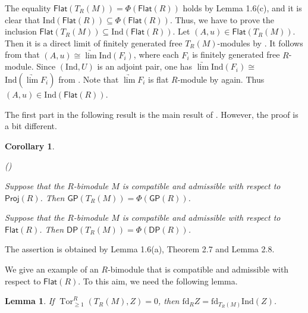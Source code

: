 \documentclass[10pt,twoside]{amsart}
\theoremstyle{bfupright head,slanted body}
\theoremstyle{bfupright head,upright body}
\theoremstyle{fixed bf head,slanted body}
\newtheorem{cor}[res]{Corollary}        \newtheorem*{cor*}{Corollary}
\newtheorem{lem}[res]{Lemma}            \newtheorem*{lem*}{Lemma}
\theoremstyle{fixed bf head,upright body}
\theoremstyle{numbered paragraph}
\newlength{\thmlistleft}        %
\newlength{\thmlistright}       %
\newlength{\thmlistpartopsep}   %
\newlength{\thmlisttopsep}      %
\newlength{\thmlistparsep}      %
\newlength{\thmlistitemsep}     %
\newcounter{prt}
\newenvironment{prt}{\begin{list}{\upshape (\alph{prt})}%
    {\usecounter{prt}%
      \setlength{\leftmargin}{\thmlistleft}%
      \setlength{\labelwidth}{\thmlistleft}%
      \setlength{\rightmargin}{\thmlistright}%
      \setlength{\partopsep}{\thmlistpartopsep}%
      \setlength{\topsep}{\thmlisttopsep}%
      \setlength{\parsep}{\thmlistparsep}%
      \setlength{\itemsep}{\thmlistitemsep}}}%
  {\end{list}}%
\newenvironment{prf*}[1][Proof]{%
  \begin{proof}[\bf #1]
    \setcounter{equation}{0}
    \renewcommand{\theequation}{\arabic{equation}}}
  {\end{proof}
}
\numberwithin{equation}{res}
\newcommand{\GP}{\mathsf{GP}}
\newcommand{\DP}{\mathsf{DP}}
\newcommand{\Proj}{\mathsf{Proj}}
\newcommand{\fd}{\mathrm{fd}}
\newcommand{\Flat}{\mathsf{Flat}}
\newcommand{\Ind}{\mathrm{Ind}}
\newcommand{\Tor}{\operatorname{Tor}}
\begin{document}
\begin{prf*}
The equality $\Flat(T_R(M))=\Phi(\Flat(R))$ holds by Lemma 1.6(c),
and it is clear that $\Ind(\Flat(R))\subseteq\Phi(\Flat(R))$. 
Thus, we have to prove the inclusion $\Flat(T_R(M)) \subseteq \Ind(\Flat(R))$.
Let $(A,u)\in\Flat(T_R(M))$. Then it is a direct limit of finitely generated free $T_R(M)$-modules
by \cite[Theorem 5.40]{Rot}. It follows from \cite[Lemma 1.7(c)]{DL} that $(A,u)\cong \underrightarrow{\lim}\Ind(F_{i})$, where each $F_{i}$ is finitely generated free $R$-module.
Since $(\Ind,U)$ is an adjoint pair, one has $\underrightarrow{\lim}\Ind(F_{i})\cong$ $\Ind(\underrightarrow{\lim}F_{i})$ from \cite[Theorem 5.43]{Rot}.
Note that $\underrightarrow{\lim}F_{i}$ is flat $R$-module by \cite[Theorem 5.40]{Rot} again.
Thus $(A,u)\in\Ind(\Flat(R))$.
\end{prf*}

The first part in the following result is the main result of \cite[Theorem 2.11]{DL}. However, the proof is a bit different.

\begin{cor}\label{G-proj}
\begin{prt}
\item
Suppose that the $R$-bimodule $M$  is compatible and admissible with respect to $\Proj(R)$. 
Then $\GP(T_R(M)) = \Phi(\GP(R))$.
\item
Suppose that the $R$-bimodule $M$  is compatible and admissible with respect to $\Flat(R)$. 
Then $\DP(T_R(M)) = \Phi(\DP(R))$.
\end{prt}
\end{cor}

\begin{prf*}
The assertion is obtained by Lemma 1.6(a), Theorem 2.7 and Lemma 2.8.
\end{prf*}

We give an example of an $R$-bimodule that is compatible and admissible with respect to $\Flat(R)$.
To this aim, we need the following lemma.

\begin{lem} 
If $\Tor_{\geqslant 1}^R(T_R(M), Z)=0$, then $\fd_R Z=\fd_{T_R(M)}\Ind(Z)$.
\end{lem}
\end{document}
